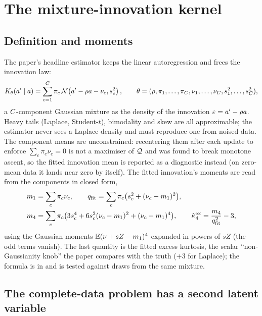 \section{The mixture-innovation kernel}

\subsection{Definition and moments}

The paper's headline estimator keeps the linear autoregression and frees the
innovation law:
\begin{equation}
  K_{\theta}(a'\mid a)=\sum_{c=1}^{C}\pi_c\,\mathcal{N}\!\left(a'-\rho a-\nu_c,s_c^2\right),\qquad
  \theta=(\rho,\pi_1,\dots,\pi_C,\nu_1,\dots,\nu_C,s_1^2,\dots,s_C^2),
  \label{eq:en-mixture}
\end{equation}
a $C$-component Gaussian mixture as the density of the innovation
$\varepsilon=a'-\rho a$. Heavy tails (Laplace, Student-$t$), bimodality and skew are all
approximable; the estimator never sees a Laplace density and must reproduce one from
noised data. The component means are unconstrained: recentering them after each
update to enforce $\sum_c\pi_c\nu_c=0$ is not a maximiser of $\mathcal{Q}$ and was found to
break monotone ascent, so the fitted innovation mean is reported as a diagnostic
instead (on zero-mean data it lands near zero by itself). The fitted innovation's
moments are read from the components in closed form,
\begin{equation}
\begin{aligned}
  m_1&=\sum_c\pi_c\nu_c,\qquad
  q_{\mathrm{fit}}=\sum_c\pi_c\bigl(s_c^2+(\nu_c-m_1)^2\bigr),\\
  m_4&=\sum_c\pi_c\bigl(3s_c^4+6s_c^2(\nu_c-m_1)^2+(\nu_c-m_1)^4\bigr),\qquad
  \hat\kappa_4^{\mathrm{ex}}=\frac{m_4}{q_{\mathrm{fit}}^2}-3,
\end{aligned}
  \label{eq:en-moments}
\end{equation}
using the Gaussian moments $\mathbb{E}(\nu+sZ-m_1)^4$ expanded in powers of $sZ$ (the odd
terms vanish). The last quantity is the fitted excess kurtosis, the scalar
``non-Gaussianity knob'' the paper compares with the truth ($+3$ for Laplace); the
formula is  in  and is
tested against draws from the same mixture.

\subsection{The complete-data problem has a second latent variable}

